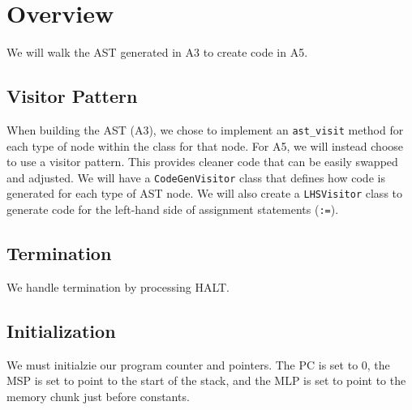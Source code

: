 \section{Overview}
We will walk the AST generated in A3 to create code in A5.

\subsection{Visitor Pattern}
When building the AST (A3), we chose to implement an \texttt{ast\_visit} method
for each type of node within the class for that node. For A5, we will
instead choose to use a visitor pattern. This provides cleaner code that can be
easily swapped and adjusted. We will have a \texttt{CodeGenVisitor} class that
defines how code is generated for each type of AST node. We will also create a
\texttt{LHSVisitor} class to generate code for the left-hand side of assignment
statements (\texttt{:=}).

\subsection{Termination}
We handle termination by processing HALT.

\subsection{Initialization}
We must initialzie our program counter and pointers. The PC is set to 0, the MSP
is set to point to the start of the stack, and the MLP is set to point to the memory
chunk just before constants.
